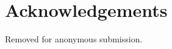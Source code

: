 \documentclass[12pt]{article}
\begin{document}

\section{Acknowledgements}


Removed for anonymous submission.



\end{document}
